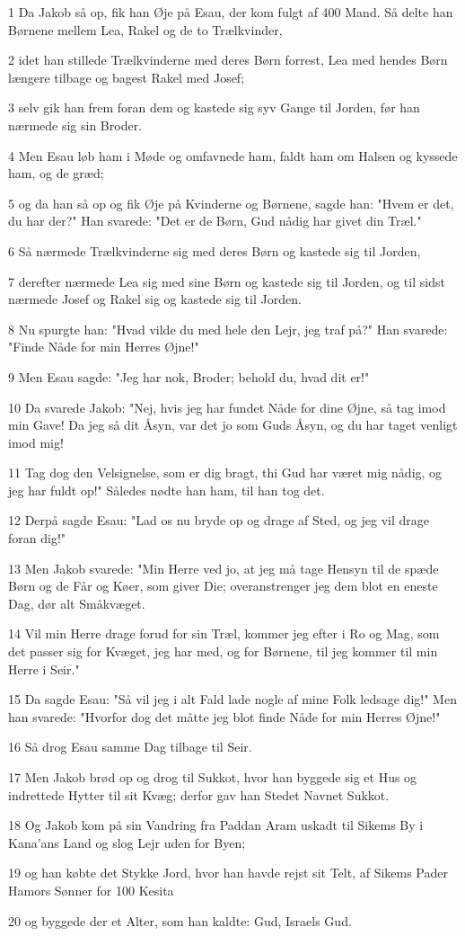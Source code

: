 \par 1 Da Jakob så op, fik han Øje på Esau, der kom fulgt af 400 Mand. Så delte han Børnene mellem Lea, Rakel og de to Trælkvinder,
\par 2 idet han stillede Trælkvinderne med deres Børn forrest, Lea med hendes Børn længere tilbage og bagest Rakel med Josef;
\par 3 selv gik han frem foran dem og kastede sig syv Gange til Jorden, før han nærmede sig sin Broder.
\par 4 Men Esau løb ham i Møde og omfavnede ham, faldt ham om Halsen og kyssede ham, og de græd;
\par 5 og da han så op og fik Øje på Kvinderne og Børnene, sagde han: "Hvem er det, du har der?" Han svarede: "Det er de Børn, Gud nådig har givet din Træl."
\par 6 Så nærmede Trælkvinderne sig med deres Børn og kastede sig til Jorden,
\par 7 derefter nærmede Lea sig med sine Børn og kastede sig til Jorden, og til sidst nærmede Josef og Rakel sig og kastede sig til Jorden.
\par 8 Nu spurgte han: "Hvad vilde du med hele den Lejr, jeg traf på?" Han svarede: "Finde Nåde for min Herres Øjne!"
\par 9 Men Esau sagde: "Jeg har nok, Broder; behold du, hvad dit er!"
\par 10 Da svarede Jakob: "Nej, hvis jeg har fundet Nåde for dine Øjne, så tag imod min Gave! Da jeg så dit Åsyn, var det jo som Guds Åsyn, og du har taget venligt imod mig!
\par 11 Tag dog den Velsignelse, som er dig bragt, thi Gud har været mig nådig, og jeg har fuldt op!" Således nødte han ham, til han tog det.
\par 12 Derpå sagde Esau: "Lad os nu bryde op og drage af Sted, og jeg vil drage foran dig!"
\par 13 Men Jakob svarede: "Min Herre ved jo, at jeg må tage Hensyn til de spæde Børn og de Får og Køer, som giver Die; overanstrenger jeg dem blot en eneste Dag, dør alt Småkvæget.
\par 14 Vil min Herre drage forud for sin Træl, kommer jeg efter i Ro og Mag, som det passer sig for Kvæget, jeg har med, og for Børnene, til jeg kommer til min Herre i Seir."
\par 15 Da sagde Esau: "Så vil jeg i alt Fald lade nogle af mine Folk ledsage dig!" Men han svarede: "Hvorfor dog det måtte jeg blot finde Nåde for min Herres Øjne!"
\par 16 Så drog Esau samme Dag tilbage til Seir.
\par 17 Men Jakob brød op og drog til Sukkot, hvor han byggede sig et Hus og indrettede Hytter til sit Kvæg; derfor gav han Stedet Navnet Sukkot.
\par 18 Og Jakob kom på sin Vandring fra Paddan Aram uskadt til Sikems By i Kana'ans Land og slog Lejr uden for Byen;
\par 19 og han købte det Stykke Jord, hvor han havde rejst sit Telt, af Sikems Pader Hamors Sønner for 100 Kesita
\par 20 og byggede der et Alter, som han kaldte: Gud, Israels Gud.

